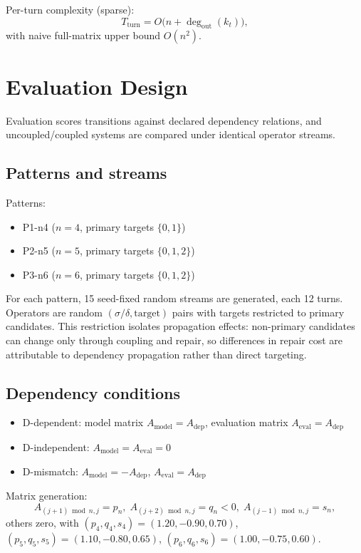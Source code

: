 \documentclass[11pt,a4paper]{article}
\begin{document}
Per-turn complexity (sparse):
\[
T_{\text{turn}}=O\big(n+\deg_{\text{out}}(k_t)\big),
\]
with naive full-matrix upper bound \(O(n^2)\).

\section{Evaluation Design}
Evaluation scores transitions against declared dependency relations, and uncoupled/coupled systems are compared under identical operator streams.

\subsection{Patterns and streams}
Patterns:
\begin{itemize}
  \item P1-n4 (\(n=4\), primary targets \(\{0,1\}\))
  \item P2-n5 (\(n=5\), primary targets \(\{0,1,2\}\))
  \item P3-n6 (\(n=6\), primary targets \(\{0,1,2\}\))
\end{itemize}
For each pattern, 15 seed-fixed random streams are generated, each 12 turns.
Operators are random \((\sigma/\delta,\text{target})\) pairs with targets restricted to primary candidates.
This restriction isolates propagation effects: non-primary candidates can change only through coupling and repair, so differences in repair cost are attributable to dependency propagation rather than direct targeting.

\subsection{Dependency conditions}
\begin{itemize}
  \item D-dependent: model matrix \(A_{\text{model}}=A_{\text{dep}}\), evaluation matrix \(A_{\text{eval}}=A_{\text{dep}}\)
  \item D-independent: \(A_{\text{model}}=A_{\text{eval}}=0\)
  \item D-mismatch: \(A_{\text{model}}=-A_{\text{dep}}\), \(A_{\text{eval}}=A_{\text{dep}}\)
\end{itemize}

Matrix generation:
\[
A_{(j+1)\bmod n,j}=p_n,\;
A_{(j+2)\bmod n,j}=q_n<0,\;
A_{(j-1)\bmod n,j}=s_n,
\]
others zero, with
\((p_4,q_4,s_4)=(1.20,-0.90,0.70)\),
\((p_5,q_5,s_5)=(1.10,-0.80,0.65)\),
\((p_6,q_6,s_6)=(1.00,-0.75,0.60)\).
\end{document}
